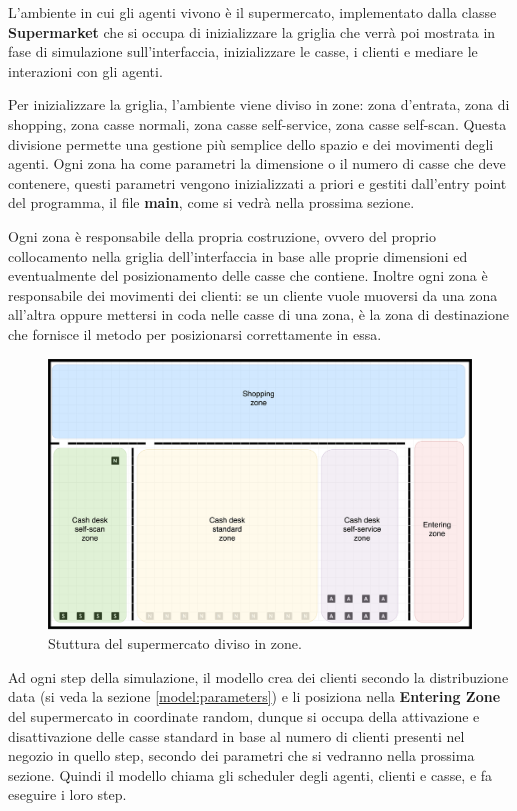 L'ambiente in cui gli agenti vivono è il supermercato, implementato dalla classe \textbf{Supermarket} che si occupa di inizializzare la griglia che verrà poi mostrata in fase di simulazione sull'interfaccia, inizializzare le casse, i clienti e mediare le interazioni con gli agenti.

Per inizializzare la griglia, l'ambiente viene diviso in zone: zona d'entrata, zona di shopping, zona casse normali, zona casse self-service, zona casse self-scan. Questa divisione permette una gestione più semplice dello spazio e dei movimenti degli agenti. Ogni zona ha come parametri la dimensione o il numero di casse che deve contenere, questi parametri vengono inizializzati a priori e gestiti dall'entry point del programma, il file \textbf{main}, come si vedrà nella prossima sezione.

Ogni zona è responsabile della propria costruzione, ovvero del proprio collocamento nella griglia dell'interfaccia in base alle proprie dimensioni ed eventualmente del posizionamento delle casse che contiene. Inoltre ogni zona è responsabile dei movimenti dei clienti: se un cliente vuole muoversi da una zona all'altra oppure mettersi in coda nelle casse di una zona, è la zona di destinazione che fornisce il metodo per posizionarsi correttamente in essa.


\begin{figure}[H]
	\centering
	\includegraphics[width=14cm]{"images/supermarket-start-zones.png"}
	\caption{Stuttura del supermercato diviso in zone.}
	\label{fig:supermarket_zones}
\end{figure}


 Ad ogni step della simulazione, il modello crea dei clienti secondo la distribuzione data (si veda la sezione \ref{model:parameters}) e li posiziona nella \textbf{Entering Zone} del supermercato in coordinate random, dunque si occupa della attivazione e disattivazione delle casse standard in base al numero di clienti presenti nel negozio in quello step, secondo dei parametri che si vedranno nella prossima sezione. Quindi il modello chiama gli scheduler degli agenti, clienti e casse, e fa eseguire i loro step.


